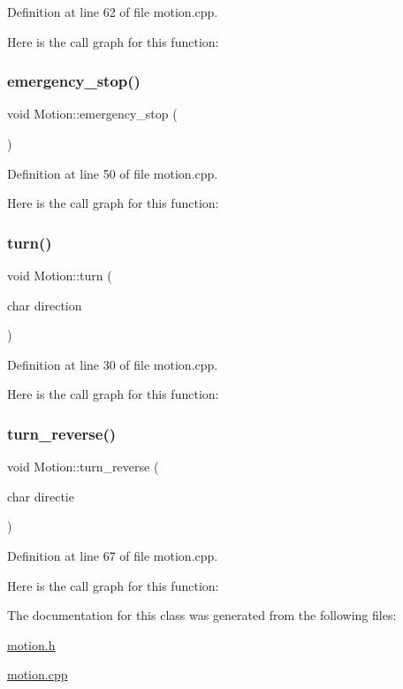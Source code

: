 Definition at line 62 of file motion.\+cpp.

Here is the call graph for this function\+:
\mbox{\label{class_motion_a44ce916fa9aad6277f0990b14a4259ef}} 
\subsubsection{\texorpdfstring{emergency\+\_\+stop()}{emergency\_stop()}}
{\footnotesize\ttfamily void Motion\+::emergency\+\_\+stop (\begin{DoxyParamCaption}{ }\end{DoxyParamCaption})}



Definition at line 50 of file motion.\+cpp.

Here is the call graph for this function\+:
\mbox{\label{class_motion_af922ccbd27054420dd1ff679d48f588d}} 
\subsubsection{\texorpdfstring{turn()}{turn()}}
{\footnotesize\ttfamily void Motion\+::turn (\begin{DoxyParamCaption}\item[{char}]{direction }\end{DoxyParamCaption})}



Definition at line 30 of file motion.\+cpp.

Here is the call graph for this function\+:
\mbox{\label{class_motion_a73524a9eb0bf44b4956622fcea759fd0}} 
\subsubsection{\texorpdfstring{turn\+\_\+reverse()}{turn\_reverse()}}
{\footnotesize\ttfamily void Motion\+::turn\+\_\+reverse (\begin{DoxyParamCaption}\item[{char}]{directie }\end{DoxyParamCaption})}



Definition at line 67 of file motion.\+cpp.

Here is the call graph for this function\+:


The documentation for this class was generated from the following files\+:\begin{DoxyCompactItemize}
\item 
\mbox{\hyperlink{motion_8h}{motion.\+h}}\item 
\mbox{\hyperlink{motion_8cpp}{motion.\+cpp}}\end{DoxyCompactItemize}
